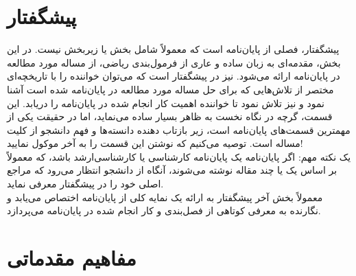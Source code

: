 \documentclass[12pt]{report}
\begin{document}



\chapter*{پیشگفتار }

پیشگفتار، فصلی از پایان‌نامه است که معمولاً شامل بخش یا زیربخش نیست. در این بخش، مقدمه‌ای به زبان ساده و عاری از فرمول‌بندی ریاضی، از مساله مورد مطالعه در پایان‌نامه ارائه می‌شود. نیز در پیشگفتار است که می‌توان خواننده را با تاریخچه‌ای مختصر از تلاش‌هایی که برای حل مساله مورد مطالعه در پایان‌نامه شده است آشنا نمود و نیز تلاش نمود تا خواننده اهمیت کار انجام شده در پایان‌نامه را دریابد. این قسمت، گرچه در نگاه نخست به ظاهر بسیار ساده می‌نماید، اما در حقیقت یکی از  مهمترین قسمت‌های پایان‌نامه است، زیر بازتاب دهنده دانسته‌ها و فهم دانشجو از کلیت مساله است. توصیه می‌کنیم که نوشتن این قسمت را به آخر موکول نمایید!
\\
یک نکته مهم: اگر پایان‌نامه یک پایان‌نامه کارشناسی یا کارشناسی‌ارشد باشد، که معمولاً بر اساس یک یا چند مقاله نوشته می‌شوند، آنگاه از دانشجو انتظار می‌رود که مراجع اصلی خود را در پیشگفتار معرفی نماید.
\\
معمولاً بخش آخر پیشگفتار به ارائه یک نمایه کلی از پایان‌نامه اختصاص می‌یابد و نگارنده به معرفی کوتاهی از فصل‌بندی و کار انجام شده در پایان‌نامه می‌پردازد.

\tableofcontents

\chapter{مفاهیم مقدماتی}

\pagestyle{plain}
\setcounter{page}{1}


\end{document}
